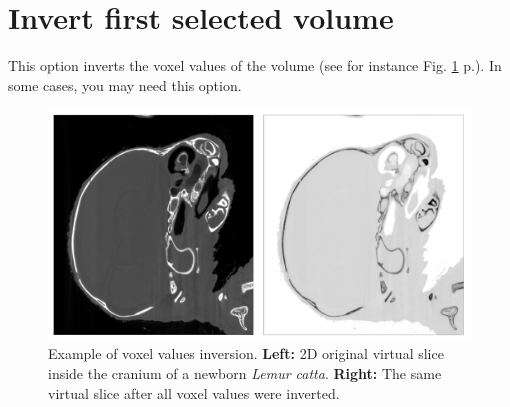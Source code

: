 \section{Invert first selected volume}

This option inverts the voxel values of the volume (see for instance Fig. \ref{invert_example} p.\pageref{invert_example}). In some cases, you may need this option.
\begin{figure}
  \centering
  \includegraphics[scale=0.3]{images/14/invert/invert_example.png}
\caption{ Example of voxel values inversion. \textbf{Left:} 2D original virtual slice inside the cranium of a newborn \textit{Lemur catta}. \textbf{Right:} The same virtual slice after all voxel values were inverted.}	
\label{invert_example}
 \end{figure}
